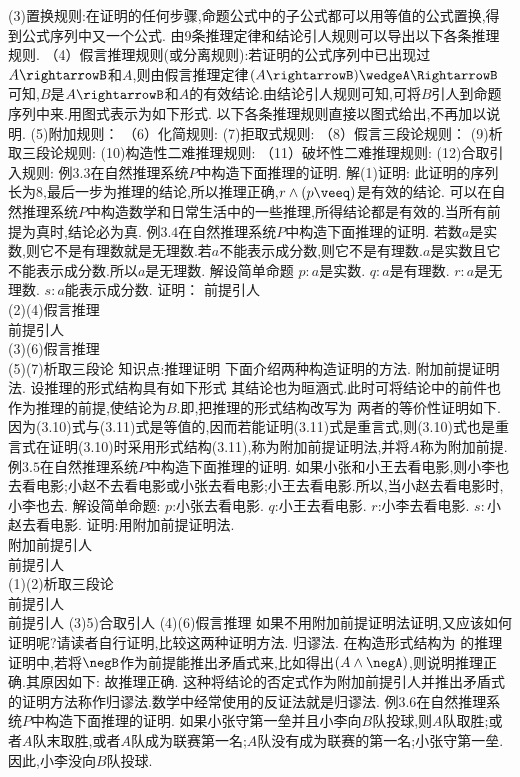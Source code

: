 {(3)置换规则:在证明的任何步骤,命题公式中的子公式都可以用等值的公式置换,得到公式序列中又一个公式.
由9条推理定律和结论引人规则可以导出以下各条推理规则.
（4）假言推理规则(或分离规则):若证明的公式序列中已出现过$A\rightarrowB$和$A$,则由假言推理定律$(A\rightarrowB)\wedgeA\RightarrowB$可知,$B$是$A\rightarrowB$和$A$的有效结论.由结论引人规则可知,可将$B$引人到命题序列中来.用图式表示为如下形式.
以下各条推理规则直接以图式给出,不再加以说明.
(5)附加规则：
（6）化简规则:
(7)拒取式规则:
（8）假言三段论规则：
(9)析取三段论规则:
(10)构造性二难推理规则:
（11）破坏性二难推理规则:
(12)合取引入规则:
例$3.3$在自然推理系统$P$中构造下面推理的证明.
解(1)证明:
此证明的序列长为8,最后一步为推理的结论,所以推理正确,$r\wedge(p\veeq)$是有效的结论.
可以在自然推理系统$P$中构造数学和日常生活中的一些推理,所得结论都是有效的.当所有前提为真时,结论必为真.
例$3.4$在自然推理系统$P$中构造下面推理的证明.
若数$a$是实数,则它不是有理数就是无理数.若$a$不能表示成分数,则它不是有理数.$a$是实数且它不能表示成分数.所以$a$是无理数.
解设简单命题
$p:a$是实数.
$q:a$是有理数.
$r:a$是无理数.
$s:a$能表示成分数.
证明：
前提引人\\
(2)(4)假言推理\\
前提引人\\
(3)(6)假言推理\\
(5)(7)析取三段论
知识点:推理证明
下面介绍两种构造证明的方法.
附加前提证明法.
设推理的形式结构具有如下形式
其结论也为晅涵式.此时可将结论中的前件也作为推理的前提,使结论为$B$.即,把推理的形式结构改写为
两者的等价性证明如下.
因为(3.10)式与(3.11)式是等值的,因而若能证明(3.11)式是重言式,则(3.10)式也是重言式在证明(3.10)时采用形式结构(3.11),称为附加前提证明法,并将$A$称为附加前提.
例$3.5$在自然推理系统$P$中构造下面推理的证明.
如果小张和小王去看电影,则小李也去看电影;小赵不去看电影或小张去看电影;小王去看电影.所以,当小赵去看电影时,小李也去.
解设简单命题:
$p$:小张去看电影.
$q$:小王去看电影.
$r$:小李去看电影.
$s:$小赵去看电影.
证明:用附加前提证明法.\\
附加前提引人\\
前提引人\\
(1)(2)析取三段论\\
前提引人\\
前提引人
(3)5)合取引人
(4)(6)假言推理
如果不用附加前提证明法证明,又应该如何证明呢?请读者自行证明,比较这两种证明方法.
归谬法.
在构造形式结构为
的推理证明中,若将$\negB$作为前提能推出矛盾式来,比如得出$(A\wedge\negA)$,则说明推理正确.其原因如下:
故推理正确.
这种将结论的否定式作为附加前提引人并推出矛盾式的证明方法称作归谬法.数学中经常使用的反证法就是归谬法.
例3.6在自然推理系统$P$中构造下面推理的证明.
如果小张守第一垒并且小李向$B$队投球,则$A$队取胜;或者$A$队末取胜,或者$A$队成为联赛第一名;$A$队没有成为联赛的第一名;小张守第一垒.因此,小李没向$B$队投球.
}
